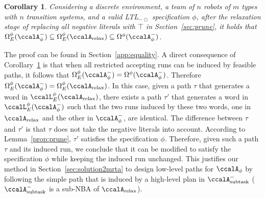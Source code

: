 \documentclass[Afour,sageh,times]{sagej}
\newtheorem{cor}[thm]{Corollary}
\newcommand{\ltl}{ {\it LTL}$_{-\bigcirc}$ }
\newcommand{\auto}[1]{\ccalA_{\textup{#1}}}
\newcommand{\autop}{\ccalA_{\phi}}
\begin{document}
{{    \begin{cor}\label{prop:equality}
Considering  a discrete environment, a team of $n$ robots of $m$ types with $n$ transition systems, and a valid \ltl specification $\phi$, after the relaxation stage of replacing all negative literals with $\top$ in Section~\ref{sec:prune}, it holds that $\Omega_E^\phi(\autop^-) \subseteq  \Omega_E^\phi(\auto{relax}) \subseteq \Omega^\phi(\autop^-)$.
    \end{cor}
    The proof can be found in Section~\ref{app:equality}. A direct consequence of Corollary~\ref{prop:equality} is that when all restricted accepting runs can be induced by feasible paths, it follows that $\Omega_E^\phi(\autop^-) = \Omega^\phi(\autop^-)$. Therefore $\Omega_E^\phi(\autop^-) =  \Omega_E^\phi(\auto{relax})$. In this case, given a path $\tau$ that generates a word in $\ccalL_E^\phi(\auto{relax})$, there exists a path $\tau'$ that generates a word in $\ccalL_E^\phi(\autop^-)$ such that the two runs induced by these two words, one in $\auto{relax}$ and the other in $\autop^-$, are identical. The difference between $\tau$ and $\tau'$ is that $\tau$ does not take the negative literals into account. According to Lemma~\ref{prop:prune}, $\tau'$ satisfies the specification $\phi$. Therefore, given such a path $\tau$ and its induced run, we conclude that it can be modified to satisfy the specification $\phi$ while keeping the induced run unchanged. This justifies our method in Section~\ref{sec:solution2mrta} to design low-level paths for $\autop$ by following the simple path  that is induced by a high-level plan in $\auto{subtask}^-$ ($\auto{subtask}^-$ is a sub-NBA of $\auto{relax}$).

}}
\end{document}
